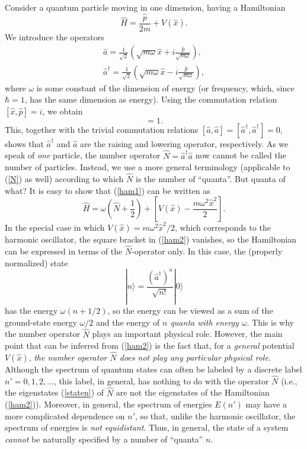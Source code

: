 \documentclass[12pt]{article}
\begin{document}
Consider a quantum particle 
moving in one dimension, having a Hamiltonian
\begin{equation}\label{ham1}
\hat{H}=\frac{\hat{p}}{2m}+V(\hat{x}) .
\end{equation}
We introduce the operators
\begin{eqnarray}\label{a1p}
& \hat{a}=\frac{1}{\sqrt{2}} \left( \sqrt{m\omega}\hat{x} 
+i \displaystyle\frac{\hat{p}}{\sqrt{m\omega}} \right) , & \nonumber \\
& \hat{a}^{\dagger}=
\frac{1}{\sqrt{2}} \left( \sqrt{m\omega}\hat{x}   
-i \displaystyle\frac{\hat{p}}{\sqrt{m\omega}} \right) ,
\end{eqnarray}
where $\omega$ is some constant of the dimension of energy
(or frequency, which, since $\hbar=1$, has the same dimension as energy).
Using the commutation relation $[\hat{x},\hat{p}]=i$, we obtain
\begin{equation}
[\hat{a},\hat{a}^{\dagger}]=1 .
\end{equation}
This, together with the trivial commutation relations
$[\hat{a},\hat{a}]=[\hat{a}^{\dagger},\hat{a}^{\dagger}]=0$, 
shows that $\hat{a}^{\dagger}$ and $\hat{a}$ are the 
raising and lowering operator, respectively.
As we speak of {\em one} particle, 
the number operator $\hat{N}=\hat{a}^{\dagger}\hat{a}$ 
now cannot be called the number of particles. Instead, 
we use a more general terminology (applicable to (\ref{N}) 
as well) according to which $\hat{N}$ is the number of 
``quanta''. But quanta of what? It is easy to show that 
(\ref{ham1}) can be written as
\begin{equation}\label{ham2}
\hat{H}=\omega\left( \hat{N}+\frac{1}{2} \right)
+\left[ V(\hat{x})-\frac{m\omega^2\hat{x}^2}{2} \right] .
\end{equation}  
In the special case in which 
$V(\hat{x})=m\omega^2\hat{x}^2/2$, which corresponds to the 
harmonic oscillator, the square bracket in (\ref{ham2})
vanishes, so the Hamiltonian can be expressed 
in terms of the $\hat{N}$-operator only. In this case, 
the (properly normalized) state
\begin{equation}\label{staten}
|n\rangle = \frac{(\hat{a}^{\dagger})^n}{\sqrt{n!}} |0\rangle
\end{equation}
has the energy $\omega (n+1/2)$, so the energy can be viewed
as a sum of the ground-state energy $\omega/2$ and the
energy of {\em $n$ quanta with energy $\omega$}. 
This is why the number operator $\hat{N}$ plays an important physical role.  
However, the main point that can be inferred from (\ref{ham2}) 
is the fact that, for a {\em general} potential $V(\hat{x})$, 
{\em the number operator
$\hat{N}$ does not play any particular physical role}.
Although the spectrum of quantum states can often be labeled 
by a discrete label $n'=0,1,2,\ldots$, this label, in general, 
has nothing to do with the operator $\hat{N}$ (i.e., the eigenstates
(\ref{staten}) of $\hat{N}$ are not the eigenstates of 
the Hamiltonian (\ref{ham2})). Moreover, 
in general, the spectrum of energies $E(n')$ may have a more 
complicated dependence on $n'$, so that, unlike the 
harmonic oscillator, the spectrum of energies is {\em not equidistant}.
Thus, in general, the state of a system 
{\em cannot} be naturally specified by a number of ``quanta'' $n$.  
\end{document}
